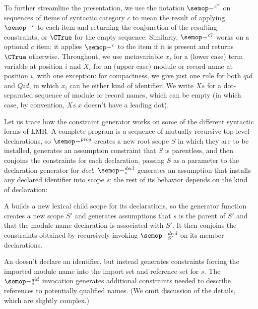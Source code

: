 To further streamline the presentation, we use the notation 
$\sema{c^*}{-}{}$ on sequences of items of syntactic category $c$ 
to mean the result of applying $\sema{c}{-}{}$ to each item and returning
the conjunction of the resulting constraints, or $\CTrue$ for the empty sequence.
Similarly, $\sema{c?}{-}{}$ works on a optional $c$ item; it applies 
$\sema{c}{-}{}$ to the item if it is present and returns $\CTrue$ otherwise.
Throughout, we use metavariable $x_i$ for a (lower case) term variable at position $i$
and $X_i$ for an (upper case)  module or record name at position $i$, with
one exception: for compactness, we give just one rule for both $qid$ and $Qid$, in which  
$x_i$ can be either kind of identifier.
We write $Xs$ for a dot-separated sequence of
module or record names, which can be empty (in which case, by convention, $Xs.x$ 
doesn't have a leading dot). 

Let us trace how the constraint generator works on some of the different syntactic forms of LMR.
A complete program is a sequence of mutually-recursive top-level declarations, 
so $\sema{prog}{-}{}$ creates a new root scope $S$
in which they are to be installed,  generates an assumption constraint
that $S$ is parentless, and then conjoins the constraints for each declaration, 
passing $S$ as a parameter to the declaration generator for {\it decl}. 
$\sema{decl}{-}{s}$ generates an assumption that installs any declared identifier into scope $s$;
the rest of its behavior depends on the kind of declaration:

A  builds a new lexical child scope for its declarations, so the generator
function creates a new scope $S'$ and generates assumptions that $s$ is the parent of $S'$ and
that the module name declaration is associated with $S'$. It then conjoins the constraints obtained
by recursively invoking $\sema{decl}{-}{S'}$ on its member declarations.

An  doesn't declare an identifier, but instead generates constraints forcing
the imported module name into the import set and reference set for $s$. The $\sema{qid}{-}{s}$ 
invocation generates additional constraints needed to describe references to potentially qualified names.
(We omit discussion of the details, which are slightly complex.)

